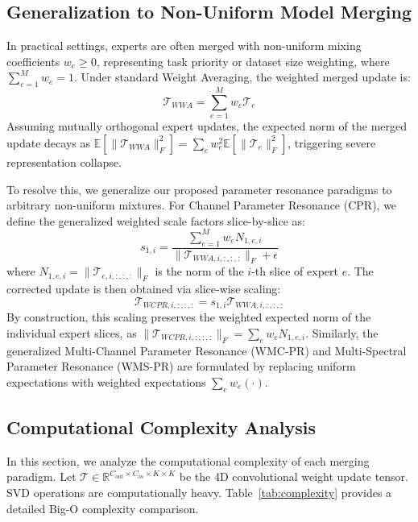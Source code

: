 \documentclass{article}
\theoremstyle{plain}
\theoremstyle{definition}
\theoremstyle{remark}
\begin{document}
\subsection{Generalization to Non-Uniform Model Merging}
In practical settings, experts are often merged with non-uniform mixing coefficients $w_e \ge 0$, representing task priority or dataset size weighting, where $\sum_{e=1}^M w_e = 1$. Under standard Weight Averaging, the weighted merged update is:
\begin{equation}
    \mathcal{T}_{WWA} = \sum_{e=1}^M w_e \mathcal{T}_e
\end{equation}
Assuming mutually orthogonal expert updates, the expected norm of the merged update decays as $\mathbb{E}[\|\mathcal{T}_{WWA}\|_F^2] = \sum_e w_e^2 \mathbb{E}[\|\mathcal{T}_e\|_F^2]$, triggering severe representation collapse. 

To resolve this, we generalize our proposed parameter resonance paradigms to arbitrary non-uniform mixtures. For Channel Parameter Resonance (CPR), we define the generalized weighted scale factors slice-by-slice as:
\begin{equation}
    s_{1, i} = \frac{\sum_{e=1}^M w_e N_{1, e, i}}{\|\mathcal{T}_{WWA, i, :, :, :}\|_F + \epsilon}
\end{equation}
where $N_{1, e, i} = \|\mathcal{T}_{e, i, :, :, :}\|_F$ is the norm of the $i$-th slice of expert $e$. The corrected update is then obtained via slice-wise scaling:
\begin{equation}
    \mathcal{T}_{WCPR, i, :, :, :} = s_{1, i} \mathcal{T}_{WWA, i, :, :, :}
\end{equation}
By construction, this scaling preserves the weighted expected norm of the individual expert slices, as $\|\mathcal{T}_{WCPR, i, :, :, :}\|_F = \sum_{e} w_e N_{1, e, i}$. Similarly, the generalized Multi-Channel Parameter Resonance (WMC-PR) and Multi-Spectral Parameter Resonance (WMS-PR) are formulated by replacing uniform expectations with weighted expectations $\sum_e w_e (\cdot)$.

\subsection{Computational Complexity Analysis}
In this section, we analyze the computational complexity of each merging paradigm. Let $\mathcal{T} \in \mathbb{R}^{C_{out} \times C_{in} \times K \times K}$ be the 4D convolutional weight update tensor. SVD operations are computationally heavy. Table~\ref{tab:complexity} provides a detailed Big-O complexity comparison.
\end{document}
